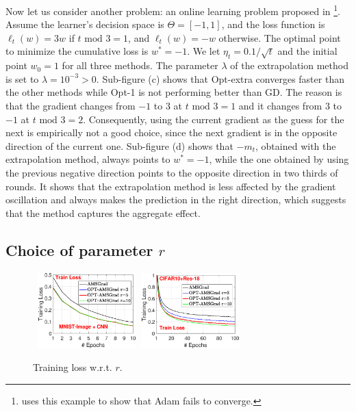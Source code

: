 \documentclass[wcp]{jmlr}
\begin{document}
Now let us consider another problem: an online learning problem proposed in \citep{RKK18}
\footnote{\citep{RKK18} uses this example to show that Adam \citep{KB15} fails to converge.}.
Assume the learner's decision space is $\Theta=[-1,1]$, and the loss function is $\ell_t(w) = 3 w$ if $t \text{ mod } 3 = 1$, and $\ell_t(w) = - w$ otherwise.
The optimal point to minimize the cumulative loss is $w^*=-1$.
We let $\eta_t=0.1 / \sqrt{t}$ and the initial point $w_0=1$ for all three methods.
The parameter $\lambda$ of the extrapolation method is set to $\lambda=10^{-3}>0$. 
Sub-figure (c) shows that Opt-extra converges faster than the other methods while Opt-1 is not performing better than GD.
The reason is that the gradient changes from $-1$ to $3$ at $t \text{ mod } 3 = 1$ and it changes from $3$ to $-1$ at $t \text{ mod } 3 = 2$.
Consequently, using the current gradient as the guess for the next is empirically not a good choice, since the next gradient is in the opposite direction of the current one.
Sub-figure (d) shows that $-m_t$, obtained with the extrapolation method, always points to $w^*=-1$, while the one obtained by using the previous negative direction points to the opposite direction in two thirds of rounds. 
It shows that the extrapolation method is less affected by the gradient oscillation and always makes the prediction in the right direction, which suggests that the method captures the aggregate effect.



\subsection{Choice of parameter $r$}\label{sec:choicer}



\begin{figure}\vspace{-0.4in}
\begin{center}
\mbox{
\includegraphics[width=1.5in]{new_figure/new_mnist_img_figure/mnist_img_train_loss_r3510_2.eps}\hspace{-0.1in}
\includegraphics[width=1.5in]{new_figure/cifar10_train_loss_r3510.eps}
}
\end{center}\vspace{-0.20in}
\caption{Training loss w.r.t. $r$.}\label{fig:compare}\vspace{-0.1in}
\end{figure}
\end{document}
